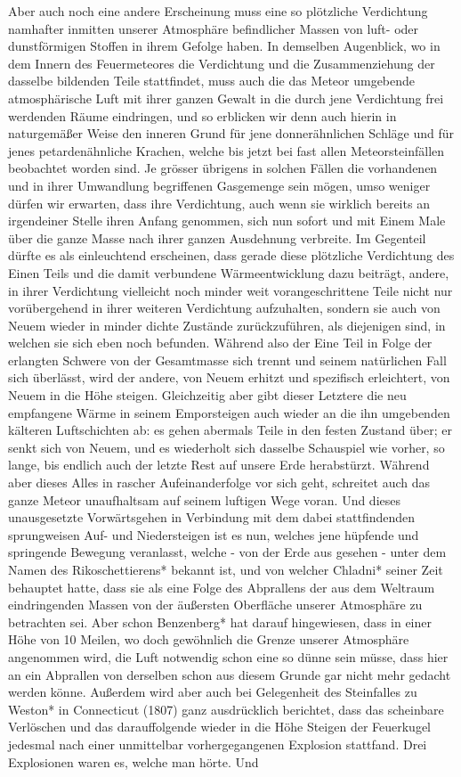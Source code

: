 \documentclass[a4paper, 11pt, oneside, polutonikogreek, german]{article}
\begin{document}
Aber auch noch eine andere Erscheinung muss eine so plötzliche Verdichtung namhafter inmitten unserer Atmosphäre befindlicher Massen von luft- oder dunstförmigen Stoffen in ihrem Gefolge haben. In demselben Augenblick, wo in dem Innern des Feuermeteores die Verdichtung und die Zusammenziehung der dasselbe bildenden Teile stattfindet, muss auch die das Meteor umgebende atmosphärische Luft mit ihrer ganzen Gewalt in die durch jene Verdichtung frei werdenden Räume eindringen, und so erblicken wir denn auch hierin in naturgemäßer Weise den inneren Grund für jene donnerähnlichen Schläge und für jenes petardenähnliche Krachen, welche bis jetzt bei fast allen Meteorsteinfällen beobachtet worden sind. Je grösser übrigens in solchen Fällen die vorhandenen und in ihrer Umwandlung begriffenen Gasgemenge sein mögen, umso weniger dürfen wir erwarten, dass ihre Verdichtung, auch wenn sie wirklich bereits an irgendeiner Stelle ihren Anfang genommen, sich nun sofort und mit Einem Male über die ganze Masse nach ihrer ganzen Ausdehnung verbreite. Im Gegenteil dürfte es als einleuchtend erscheinen, dass gerade diese plötzliche Verdichtung des Einen Teils und die damit verbundene Wärmeentwicklung dazu beiträgt, andere, in ihrer Verdichtung vielleicht noch minder weit vorangeschrittene Teile nicht nur vorübergehend in ihrer weiteren Verdichtung aufzuhalten, sondern sie auch von Neuem wieder in minder dichte Zustände zurückzuführen, als diejenigen sind, in welchen sie sich eben noch befunden. Während also der Eine Teil in Folge der erlangten Schwere von der Gesamtmasse sich trennt und seinem natürlichen Fall sich überlässt, wird der andere, von Neuem erhitzt und spezifisch erleichtert, von Neuem in die Höhe steigen. Gleichzeitig aber gibt dieser Letztere die neu empfangene Wärme in seinem Emporsteigen auch wieder an die ihn umgebenden kälteren Luftschichten ab: es gehen abermals Teile in den festen Zustand über; er senkt sich von Neuem, und es wiederholt sich dasselbe Schauspiel wie vorher, so lange, bis endlich auch der letzte Rest auf unsere Erde herabstürzt. Während aber dieses Alles in rascher Aufeinanderfolge vor sich geht, schreitet auch das ganze Meteor unaufhaltsam auf seinem luftigen Wege voran. Und dieses unausgesetzte Vorwärtsgehen in Verbindung mit dem dabei stattfindenden sprungweisen Auf- und Niedersteigen ist es nun, welches jene hüpfende und springende Bewegung veranlasst, welche - von der Erde aus gesehen - unter dem Namen des Rikoschettierens* bekannt ist, und von welcher Chladni* seiner Zeit behauptet hatte, dass sie als eine Folge des Abprallens der aus dem Weltraum eindringenden Massen von der äußersten Oberfläche unserer Atmosphäre zu betrachten sei. Aber schon Benzenberg* hat darauf hingewiesen, dass in einer Höhe von 10 Meilen, wo doch gewöhnlich die Grenze unserer Atmosphäre angenommen wird, die Luft notwendig schon eine so dünne sein müsse, dass hier an ein Abprallen von derselben schon aus diesem Grunde gar nicht mehr gedacht werden könne. Außerdem wird aber auch bei Gelegenheit des Steinfalles zu Weston* in Connecticut (1807) ganz ausdrücklich berichtet, dass das scheinbare Verlöschen und das darauffolgende wieder in die Höhe Steigen der Feuerkugel jedesmal nach einer unmittelbar vorhergegangenen Explosion stattfand. Drei Explosionen waren es, welche man hörte. Und 
\end{document}
